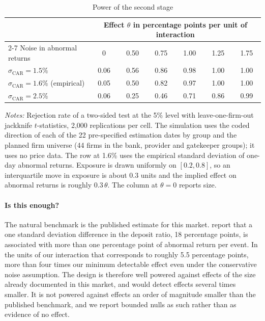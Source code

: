 \documentclass[11pt]{article}
\theoremstyle{plain}\newtheorem{proposition}{Proposition}
\begin{document}
\begin{table}[t]\centering\small
\begin{threeparttable}
\caption{Power of the second stage}\label{tab:power}
\begin{tabular}{lcccccc}
\toprule
& \multicolumn{6}{c}{Effect $\theta$ in percentage points per unit of interaction} \\
\cmidrule(lr){2-7}
Noise in abnormal returns & 0 & 0.50 & 0.75 & 1.00 & 1.25 & 1.75 \\
\midrule
$\sigma_{\text{CAR}} = 1.5\%$ & 0.06 & 0.56 & 0.86 & 0.98 & 1.00 & 1.00 \\
$\sigma_{\text{CAR}} = 1.6\%$ (empirical) & 0.05 & 0.50 & 0.82 & 0.97 & 1.00 & 1.00 \\
$\sigma_{\text{CAR}} = 2.5\%$ & 0.06 & 0.25 & 0.46 & 0.71 & 0.86 & 0.99 \\
\bottomrule
\end{tabular}
\begin{tablenotes}\footnotesize
\item \textit{Notes:} Rejection rate of a two-sided test at the 5\% level with leave-one-firm-out jackknife $t$-statistics, 2,000 replications per cell. The simulation uses the coded direction of each of the 22 pre-specified estimation dates by group and the planned firm universe (44 firms in the bank, provider and gatekeeper groups); it uses no price data. The row at 1.6\% uses the empirical standard deviation of one-day abnormal returns. Exposure is drawn uniformly on $[0.2, 0.8]$, so an interquartile move in exposure is about 0.3 units and the implied effect on abnormal returns is roughly $0.3\,\theta$. The column at $\theta=0$ reports size.
\end{tablenotes}
\end{threeparttable}
\end{table}

\paragraph{Is this enough?} The natural benchmark is the published estimate for this market. \citet{burlon2024} report that a one standard deviation difference in the deposit ratio, 18 percentage points, is associated with more than one percentage point of abnormal return per event. In the units of our interaction that corresponds to roughly 5.5 percentage points, more than four times our minimum detectable effect even under the conservative noise assumption. The design is therefore well powered against effects of the size already documented in this market, and would detect effects several times smaller. It is not powered against effects an order of magnitude smaller than the published benchmark, and we report bounded nulls as such rather than as evidence of no effect.
\end{document}

